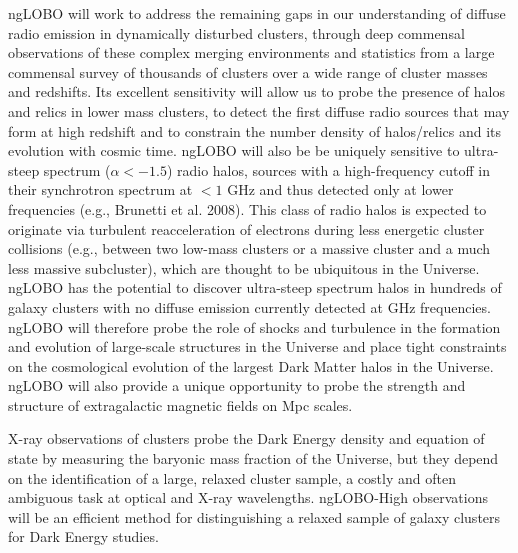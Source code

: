\documentclass[11pt]{article}
\begin{document}
ngLOBO will work to address the remaining gaps in our understanding of diffuse 
radio emission in dynamically disturbed clusters, through deep commensal observations of 
these complex merging environments and statistics from a large commensal survey of thousands 
of clusters over a wide range of cluster masses and redshifts. Its excellent sensitivity 
will allow us to probe the presence of halos and relics in lower mass clusters, to detect 
the first diffuse radio sources that may form at high redshift and to constrain the 
number density of halos/relics and its evolution with cosmic time. ngLOBO will also be
be uniquely sensitive to ultra-steep spectrum ($\alpha < -1.5$) radio halos, 
sources with a high-frequency cutoff in their synchrotron spectrum at $< 1$ GHz and thus detected only at
lower frequencies (e.g., Brunetti et al. 2008). This class of radio halos is expected to
originate via turbulent reacceleration of electrons during less energetic cluster collisions 
(e.g., between two low-mass clusters or a massive cluster and a much less massive subcluster), 
which are thought to be ubiquitous in the Universe. ngLOBO has the potential to discover ultra-steep 
spectrum halos in hundreds of galaxy clusters with no diffuse emission currently detected 
at GHz frequencies. ngLOBO will therefore probe the role of shocks and turbulence in 
the formation and evolution of large-scale structures in the Universe and place tight constraints on the 
cosmological evolution of the largest Dark Matter halos in the Universe. ngLOBO will 
also provide a unique opportunity to probe the strength and structure of extragalactic magnetic 
fields on Mpc scales.

X-ray observations of clusters probe the Dark Energy density and equation of state by 
measuring the baryonic mass fraction of the Universe, but they depend on the identification 
of a large, relaxed cluster sample, a costly and often ambiguous task at optical and 
X-ray wavelengths. ngLOBO-High observations will be an efficient method for distinguishing 
a relaxed sample of galaxy clusters for Dark Energy studies.


\end{document}
